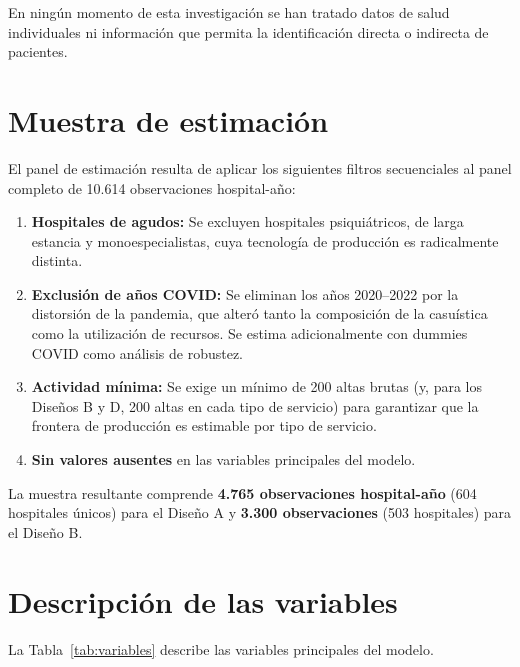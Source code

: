 En ningún momento de esta investigación se han tratado datos de salud individuales ni información que permita la identificación directa o indirecta de pacientes.

\section{Muestra de estimación}

El panel de estimación resulta de aplicar los siguientes filtros secuenciales al panel completo de 10.614 observaciones hospital-año:

\begin{enumerate}
  \item \textbf{Hospitales de agudos:} Se excluyen hospitales psiquiátricos, de larga estancia y monoespecialistas, cuya tecnología de producción es radicalmente distinta.
  \item \textbf{Exclusión de años COVID:} Se eliminan los años 2020--2022 por la distorsión de la pandemia, que alteró tanto la composición de la casuística como la utilización de recursos. Se estima adicionalmente con dummies COVID como análisis de robustez.
  \item \textbf{Actividad mínima:} Se exige un mínimo de 200 altas brutas (y, para los Diseños B y D, 200 altas en cada tipo de servicio) para garantizar que la frontera de producción es estimable por tipo de servicio.
  \item \textbf{Sin valores ausentes} en las variables principales del modelo.
\end{enumerate}

La muestra resultante comprende \textbf{4.765 observaciones hospital-año} (604 hospitales únicos) para el Diseño A y \textbf{3.300 observaciones} (503 hospitales) para el Diseño B.

\section{Descripción de las variables}
\label{sec:variables}

La Tabla~\ref{tab:variables} describe las variables principales del modelo.

